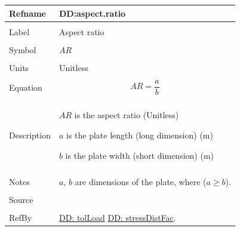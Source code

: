 \documentclass[12pt]{article}
\begin{document}
\noindent \begin{minipage}{\textwidth}
\begin{tabular}{p{} p{}}
\toprule \textbf{Refname} & \textbf{DD:aspect.ratio}
\label{DD:aspect.ratio}
\\ \midrule \\
Label & Aspect ratio
        \\ \midrule \\
        Symbol & $AR$
                 \\ \midrule \\
                 Units & Unitless
                         \\ \midrule \\
                         Equation & \begin{displaymath}
                                    AR=\frac{a}{b}
                                    \end{displaymath}
                                    \\ \midrule \\
                                    Description & \begin{symbDescription}
                                                  \item{$AR$ is the aspect ratio (Unitless)}
                                                  \item{$a$ is the plate length (long dimension) (m)}
                                                  \item{$b$ is the plate width (short dimension) (m)}
                                                  \end{symbDescription}
                                                  \\ \midrule \\
                                                  Notes & $a$, $b$ are dimensions of the plate, where ($a\geq{}b$).
                                                          \\ \midrule \\
                                                          Source & \cite{astm2009}
                                                                   \\ \midrule \\
                                                                   RefBy & \hyperref[DD:tolLoad]{DD: tolLoad} \hyperref[DD:stressDistFac]{DD: stressDistFac}.
\\ \bottomrule \end{tabular}
\end{minipage}
\par~
\end{document}
